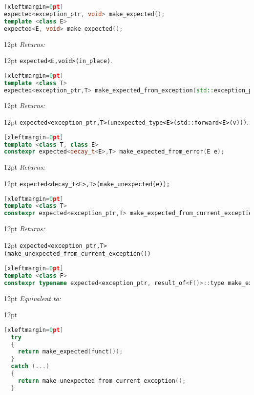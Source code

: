 \documentclass[a4paper,10pt]{article}
\newcommand{\cpp}[1]{\lstinline{#1}}
\newcommand{\wordingItem}[1]{\noindent\textit{#1:}}
\newenvironment{wordingTextItem}[1]{\wordingItem{#1}\vspace{2pt}\noindent\begin{adjustwidth}{12pt}{}}{\vspace{2pt}\end{adjustwidth}}
\newenvironment{wordingPara}{\begin{adjustwidth}{12pt}{}}{\end{adjustwidth}}
\begin{document}
\begin{lstlisting}[language=C++][xleftmargin=0pt]
expected<exception_ptr, void> make_expected(); 
template <class E>
expected<E, void> make_expected(); 
\end{lstlisting}
\begin{wordingPara}
\begin{wordingTextItem}{Returns}
\cpp{expected<E,void>(in_place)}.
\end{wordingTextItem}
\end{wordingPara}

\begin{lstlisting}[language=C++][xleftmargin=0pt]
template <class T>
expected<exception_ptr,T> make_expected_from_exception(std::exception_ptr v); 
\end{lstlisting}
\begin{wordingPara}
\begin{wordingTextItem}{Returns}
\cpp{expected<exception_ptr,T>(unexpected_type<E>(std::forward<E>(v)))}.
\end{wordingTextItem}
\end{wordingPara}

\begin{lstlisting}[language=C++][xleftmargin=0pt]
template <class T, class E>
constexpr expected<decay_t<E>,T> make_expected_from_error(E e);
\end{lstlisting}
\begin{wordingPara}
\begin{wordingTextItem}{Returns}
\cpp{expected<decay_t<E>,T>(make_unexpected(e));}
\end{wordingTextItem}
\end{wordingPara}


\begin{lstlisting}[language=C++][xleftmargin=0pt]
template <class T>
constexpr expected<exception_ptr,T> make_expected_from_current_exception(); 
\end{lstlisting}
\begin{wordingPara}
\begin{wordingTextItem}{Returns}
\cpp{expected<exception_ptr,T>(make_unexpected_from_current_exception())}
\end{wordingTextItem}
\end{wordingPara}

\begin{lstlisting}[language=C++][xleftmargin=0pt]
template <class F>
constexpr typename expected<exception_ptr, result_of<F()>::type make_expected_from_call(F funct);
\end{lstlisting}
\begin{wordingPara}
\begin{wordingTextItem}{Equivalent to}
\begin{lstlisting}[language=C++][xleftmargin=0pt]
  try
  {
    return make_expected(funct());
  }
  catch (...)
  {
    return make_unexpected_from_current_exception();
  }
\end{lstlisting}
\end{wordingTextItem}
\end{wordingPara}
\end{document}

